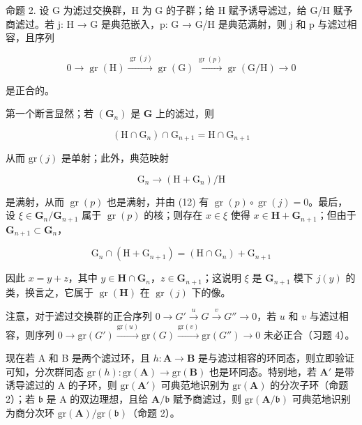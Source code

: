 命题 2. 设 G 为滤过交换群，H 为 G 的子群；给 H 赋予诱导滤过，给 G/H 赋予商滤过。若 j: H → G 是典范嵌入，p: G → G/H 是典范满射，则 j 和 p 与滤过相容，且序列

\[
0 \longrightarrow \operatorname{gr} (\mathrm{H}) \xrightarrow {\operatorname{gr} (j)} \operatorname{gr} (\mathrm{G}) \xrightarrow {\operatorname{gr} (p)} \operatorname{gr} (\mathrm{G} / \mathrm{H}) \longrightarrow 0\tag{13}
\]

是正合的。

第一个断言显然；若 \((\mathbf{G}_n)\) 是 \(\mathbf{G}\) 上的滤过，则

\[
\left(\mathrm{H} \cap \mathrm{G} _ {n}\right) \cap \mathrm{G} _ {n + 1} = \mathrm{H} \cap \mathrm{G} _ {n + 1}
\]

从而 \(\mathrm{gr}(j)\) 是单射；此外，典范映射

\[
\mathrm{G} _ {n} \rightarrow (\mathrm{H} + \mathrm{G} _ {n}) / \mathrm{H}
\]

是满射，从而 \(\operatorname{gr}(p)\) 也是满射，并由 (12) 有 \(\operatorname{gr}(p) \circ \operatorname{gr}(j) = 0\)。最后，设 \(\xi \in \mathbf{G}_n / \mathbf{G}_{n+1}\) 属于 \(\operatorname{gr}(p)\) 的核；则存在 \(x \in \xi\) 使得 \(x \in \mathbf{H} + \mathbf{G}_{n+1}\)；但由于 \(\mathbf{G}_{n+1} \subset \mathbf{G}_n\)，

\[
\mathrm{G} _ {n} \cap (\mathrm{H} + \mathrm{G} _ {n + 1}) = (\mathrm{H} \cap \mathrm{G} _ {n}) + \mathrm{G} _ {n + 1}
\]

	因此 \(x = y + z\)，其中 \(y \in \mathbf{H} \cap \mathbf{G}_n\)，\(z \in \mathbf{G}_{n+1}\)；这说明 \(\xi\) 是 \(\mathbf{G}_{n+1}\) 模下 \(j(y)\) 的类，换言之，它属于 \(\operatorname{gr}(\mathbf{H})\) 在 \(\operatorname{gr}(j)\) 下的像。

注意，对于滤过交换群的正合序列 \(0 \to G' \xrightarrow{u} G \xrightarrow{v} G'' \to 0\)，若 \(u\) 和 \(v\) 与滤过相容，则序列 \(0 \longrightarrow \text{gr}(G') \xrightarrow{\text{gr}(u)} \text{gr}(G) \xrightarrow{\text{gr}(v)} \text{gr}(G'') \longrightarrow 0\) 未必正合（习题 4）。

现在若 A 和 B 是两个滤过环，且 \(h \colon \mathbf{A} \to \mathbf{B}\) 是与滤过相容的环同态，则立即验证可知，分次群同态 \(\mathrm{gr}(h) \colon \mathrm{gr}(\mathbf{A}) \to \mathrm{gr}(\mathbf{B})\) 也是环同态。特别地，若 \(\mathbf{A}'\) 是带诱导滤过的 A 的子环，则 \(\mathrm{gr}(\mathbf{A}')\) 可典范地识别为 \(\mathrm{gr}(\mathbf{A})\) 的分次子环（命题 2）；若 \(\mathfrak{b}\) 是 A 的双边理想，且给 \(\mathbf{A} / \mathfrak{b}\) 赋予商滤过，则 \(\mathrm{gr}(\mathbf{A} / \mathfrak{b})\) 可典范地识别为商分次环 \(\mathrm{gr}(\mathbf{A}) / \mathrm{gr}(\mathfrak{b})\)（命题 2）。

